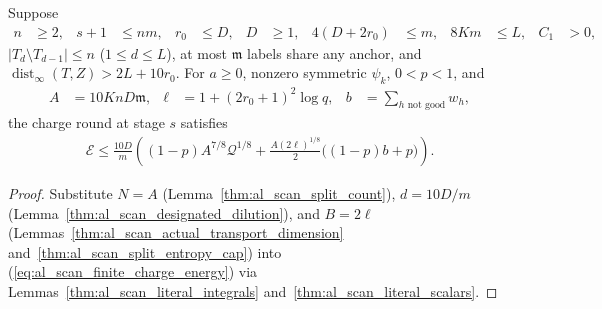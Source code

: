 \begin{lemma}
    \label{thm:al_scan_actual_charge_energy}
    \leanok
    Suppose
    \begin{align}
        n         & \ge2,  & s+1 & \le nm, & r_0 & \le D, & D & \ge1, &
        4(D+2r_0) & \le m, & 8Km & \le L,  & C_1 & >0,
        \label{eq:al_scan_charge_energy_scales}
    \end{align}
    $|T_d\setminus T_{d-1}|\le n$ ($1\le d\le L$), at most $\mathfrak m$ labels
    share any anchor, and $\operatorname{dist}_\infty(T,Z)>2L+10r_0$. For
    $a\ge0$, nonzero symmetric $\psi_k$, $0<p<1$, and
    \begin{align}
        A    & =10KnD\mathfrak m,            &
        \ell & =1+(2r_0+1)^2\log q,          &
        b    & =\sum_{h\text{ not good}}w_h,
        \label{eq:al_scan_charge_energy_capacity}
    \end{align}
    the charge round at stage $s$ satisfies
    \begin{align}
        \mathcal E\le\frac{10D}{m}
        \left((1-p)A^{7/8}\mathcal Q^{1/8}
        +\frac{A(2\ell)^{1/8}}2\bigl((1-p)b+p\bigr)\right).
        \label{eq:al_scan_actual_charge_energy}
    \end{align}
\end{lemma}
\begin{proof}\leanok
    Substitute $N=A$ (Lemma~\ref{thm:al_scan_split_count}), $d=10D/m$
    (Lemma~\ref{thm:al_scan_designated_dilution}), and $B=2\ell$
    (Lemmas~\ref{thm:al_scan_actual_transport_dimension}
    and~\ref{thm:al_scan_split_entropy_cap}) into
    (\ref{eq:al_scan_finite_charge_energy}) via
    Lemmas~\ref{thm:al_scan_literal_integrals}
    and~\ref{thm:al_scan_literal_scalars}.
\end{proof}

